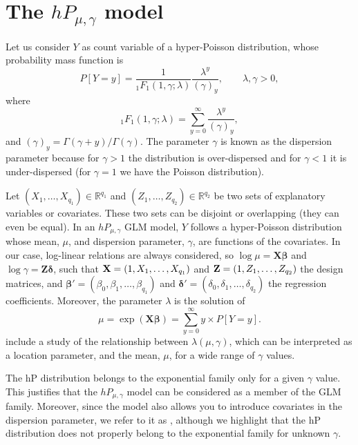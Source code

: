 \section{The $hP_{\mu, \gamma}$ model}

Let us consider $Y$ as count variable of a hyper-Poisson distribution, whose probability mass function is \citep{hp}
\begin{equation}
    P\left[Y = y \right] = \frac{1}{_{1}F_{1}\left(1, \gamma; \lambda \right)} \frac{\lambda^{y}} {\left(\gamma \right)_{y}}, \qquad \lambda, \gamma > 0, \label{hp}
\end{equation}
where
\[
_{1}F_{1}\left(1, \gamma; \lambda \right) = \sum_{y = 0}^{\infty} \frac{\lambda^{y}}{\left(\gamma\right)_{y}},
\]
and $(\gamma)_y = \Gamma(\gamma + y) / \Gamma(\gamma)$. The parameter $ \gamma $ is known as the dispersion parameter because for $ \gamma > 1 $ the distribution is over-dispersed and for $ \gamma < 1 $ it is under-dispersed (for $ \gamma = 1 $ we have the Poisson distribution).

Let $\left(X_1, \dots, X_{q_1} \right) \in \mathbb{R}^{q_1}$ and $\left(Z_1, \dots, Z_{q_2} \right) \in \mathbb{R}^{q_2}$ be two sets of explanatory variables or covariates. These two sets can be disjoint or overlapping (they can even be equal). In an $hP_{\mu, \gamma}$ GLM model, $Y$ follows a hyper-Poisson distribution whose mean, $\mu$, and dispersion parameter, $\gamma$, are functions of the covariates. In our case, log-linear relations are always considered, so $\log \mu = \mathbf{X} \boldsymbol{\beta}$ and $\log \gamma = \mathbf{Z} \boldsymbol{\delta}$, such that $ {\bf X} = \left(1, X_1, \dots, X_{q_1} \right) $ and $ {\bf Z} = \left(1, Z_1, \dots, Z_{q_2} \right) $ the design matrices, and $\boldsymbol{\beta}' = \left(\beta_0, \beta_1, \dots, \beta_{q_1} \right)$ and $\boldsymbol{\delta}' = \left(\delta_0, \delta_1, \dots, \delta_{q_2} \right)$ the regression coefficients. Moreover, the parameter $ \lambda $ is the solution of
\begin{equation}
\mu = \exp (\mathbf{X} \boldsymbol{\beta}) = \sum_{y = 0}^{\infty} y \times P[Y = y] \label{eq:link}.
\end{equation}
\citet{hp} include a study of the relationship between $\lambda(\mu, \gamma)$, which can be interpreted as a location parameter, and the mean, $\mu$, for a wide range of $\gamma$ values.

The hP distribution belongs to the exponential family only for a given $\gamma$ value. This justifies that the $hP_{\mu, \gamma}$ model can be considered as a member of the GLM family. Moreover, since the model also allows you to introduce covariates in the dispersion parameter, we refer to it as , although we highlight that the hP distribution does not properly belong to the exponential family for unknown $\gamma$.

